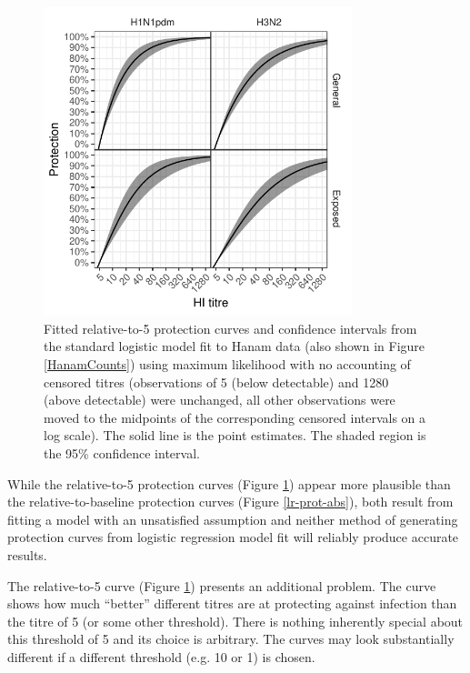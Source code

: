 \documentclass[12pt]{article}
\begin{document}
\pagebreak

\begin{figure}[htp]
	\centering
	\includegraphics[width=0.8\textwidth]{../fit-logistic-boot-plot/hanam-hi-prot-rel.pdf}
	\caption{
	Fitted relative-to-5 protection curves and confidence intervals from the standard logistic model fit to Hanam data (also shown in Figure \ref{HanamCounts}) using maximum likelihood with no accounting of censored titres (observations of 5 (below detectable) and 1280 (above detectable) were unchanged, all other observations were moved to the midpoints of the corresponding censored intervals on a log scale). The solid line is the point estimates. The shaded region is the 95\% confidence interval.
	}
	\label{lr-prot-rel}
\end{figure}

While the relative-to-5 protection curves (Figure \ref{lr-prot-rel}) appear more plausible than the relative-to-baseline protection curves (Figure \ref{lr-prot-abs}), both result from fitting a model with an unsatisfied assumption and neither method of generating protection curves from logistic regression model fit will reliably produce accurate results.

The relative-to-5 curve (Figure \ref{lr-prot-rel}) presents an additional problem. The curve shows how much ``better'' different titres are at protecting against infection than the titre of 5 (or some other threshold). There is nothing inherently special about this threshold of 5 and its choice is arbitrary. The curves may look substantially different if a different threshold (e.g. 10 or 1) is chosen.
\end{document}
